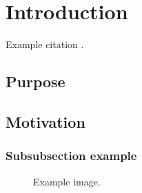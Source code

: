 \documentclass[12pt]{article} %
\begin{document}
\tableofcontents %

\newpage %


\section{Introduction} %

Example citation \cite{Figueredo:2009dg}.


\subsection{Purpose} %

\lipsum[1] %


\subsection{Motivation} %

\lipsum[2] %


\subsubsection{Subsubsection example} %

\lipsum[3] %

\begin{figure}[H] %
\caption{Example image.}
\label{fig:speciation}
\end{figure}
\end{document}
